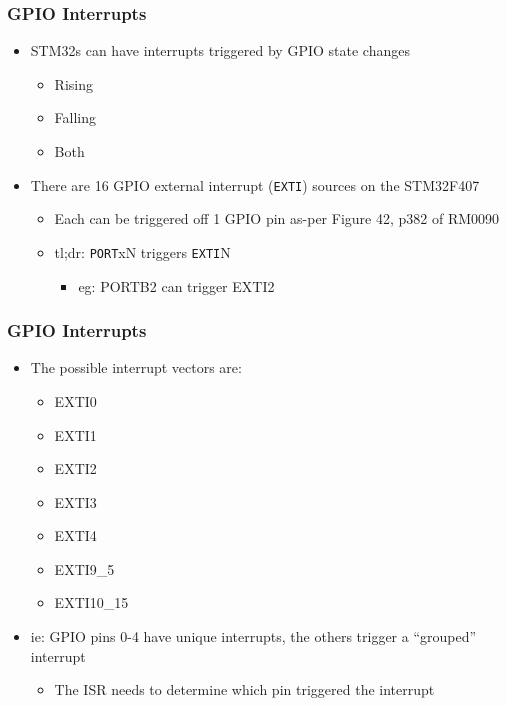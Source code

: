 \documentclass[14pt]{beamer}
\begin{document}
\begin{frame}[fragile]
\frametitle{GPIO Interrupts}
\begin{itemize}
\item STM32s can have interrupts triggered by GPIO state changes
	\begin{itemize}
		\item Rising
		\item Falling
		\item Both
	\end{itemize}
\item There are 16 GPIO external interrupt (\texttt{EXTI}) sources on the STM32F407
	\begin{itemize}
		\item Each can be triggered off 1 GPIO pin as-per Figure 42, p382 of RM0090
		\item tl;dr: \texttt{PORT}xN triggers \texttt{EXTI}N
			\begin{itemize}
				\item eg: PORTB2 can trigger EXTI2
			\end{itemize}
	\end{itemize}
\end{itemize}
\end{frame}

\begin{frame}[fragile]
\frametitle{GPIO Interrupts}
\begin{itemize}
\item The possible interrupt vectors are:
	\begin{itemize}
		\item EXTI0
		\item EXTI1
		\item EXTI2
		\item EXTI3
		\item EXTI4
		\item EXTI9\_5
		\item EXTI10\_15
	\end{itemize}
\item ie: GPIO pins 0-4 have unique interrupts, the others trigger a ``grouped'' interrupt
	\begin{itemize}
		\item The ISR needs to determine which pin triggered the interrupt
	\end{itemize}
\end{itemize}
\end{frame}
\end{document}
